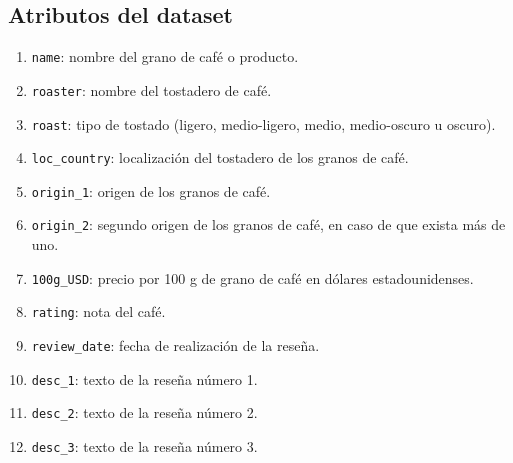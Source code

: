 \subsection*{Atributos del dataset}
\begin{enumerate}
  \item \texttt{name}: nombre del grano de café o producto.
  \item \texttt{roaster}: nombre del tostadero de café.
  \item \texttt{roast}: tipo de tostado (ligero, medio-ligero, medio, medio-oscuro u oscuro).
  \item \texttt{loc\_country}: localización del tostadero de los granos de café.
  \item \texttt{origin\_1}: origen de los granos de café.
  \item \texttt{origin\_2}: segundo origen de los granos de café, en caso de que exista más de uno.
  \item \texttt{100g\_USD}: precio por 100 g de grano de café en dólares estadounidenses.
  \item \texttt{rating}: nota del café.
  \item \texttt{review\_date}: fecha de realización de la reseña.
  \item \texttt{desc\_1}: texto de la reseña número 1.
  \item \texttt{desc\_2}: texto de la reseña número 2.
  \item \texttt{desc\_3}: texto de la reseña número 3.
\end{enumerate}
